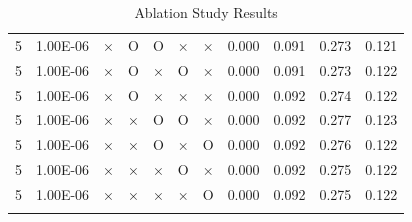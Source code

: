 \documentclass[11pt]{article}
\begin{document}
\begin{longtable}[h]{|r|r|l|l|l|l|l|r|r|l|r|}
5 & 1.00E-06 & × & O & O & × & × & 0.000 & 0.091 & 0.273 & 0.121 \\
5 & 1.00E-06 & × & O & × & O & × & 0.000 & 0.091 & 0.273 & 0.122 \\
5 & 1.00E-06 & × & O & × & × & × & 0.000 & 0.092 & 0.274 & 0.122 \\
5 & 1.00E-06 & × & × & O & O & × & 0.000 & 0.092 & 0.277 & 0.123 \\
5 & 1.00E-06 & × & × & O & × & O & 0.000 & 0.092 & 0.276 & 0.122 \\
5 & 1.00E-06 & × & × & × & O & × & 0.000 & 0.092 & 0.275 & 0.122 \\
5 & 1.00E-06 & × & × & × & × & O & 0.000 & 0.092 & 0.275 & 0.122 \\ 
\hline

\caption{Ablation Study Results}
\label{sec:tab_app_ablation}
\end{longtable}
\end{document}
